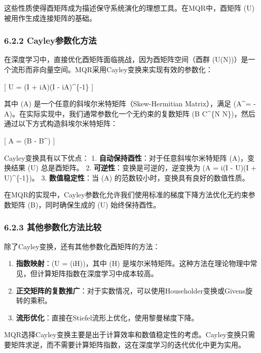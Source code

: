 \documentclass[
  12pt,
]{article}
\providecommand{\tightlist}{%
  \setlength{\itemsep}{0pt}\setlength{\parskip}{0pt}}
\begin{document}
这些性质使得酉矩阵成为描述保守系统演化的理想工具。在MQR中，酉矩阵 (U)
被用作生成连接矩阵的基础。

\hypertarget{cayleyux53c2ux6570ux5316ux65b9ux6cd5}{%
\subsubsection{6.2.2
Cayley参数化方法}\label{cayleyux53c2ux6570ux5316ux65b9ux6cd5}}

在深度学习中，直接优化酉矩阵面临挑战，因为酉矩阵空间（酉群
(U(N))）是一个流形而非向量空间。MQR采用Cayley变换来实现有效的参数化：

{[} U = (I + iA)(I - iA)\^{}\{-1\} {]}

其中 (A) 是一个任意的斜埃尔米特矩阵（Skew-Hermitian Matrix），满足
(A\^{}\dagger = -A)。在实际实现中，我们通常参数化一个无约束的复数矩阵 (B
\in C\^{}\{N \times N\})，然后通过以下方式构造斜埃尔米特矩阵：

{[} A = (B - B\^{}\dagger) {]}

Cayley变换具有以下优点： 1.
\textbf{自动保持酉性}：对于任意斜埃尔米特矩阵 (A)，变换结果 (U)
总是酉矩阵。 2. \textbf{可逆性}：变换是可逆的，逆变换为 (A = i(I - U)(I
+ U)\^{}\{-1\})。 3. \textbf{数值稳定性}：当 (A)
的范数较小时，变换具有良好的数值性质。

在MQR的实现中，Cayley参数化允许我们使用标准的梯度下降方法优化无约束参数矩阵
(B)，同时确保生成的 (U) 始终保持酉性。

\hypertarget{ux5176ux4ed6ux53c2ux6570ux5316ux65b9ux6cd5ux6bd4ux8f83}{%
\subsubsection{6.2.3
其他参数化方法比较}\label{ux5176ux4ed6ux53c2ux6570ux5316ux65b9ux6cd5ux6bd4ux8f83}}

除了Cayley变换，还有其他参数化酉矩阵的方法：

\begin{enumerate}
\def\labelenumi{\arabic{enumi}.}
\tightlist
\item
  \textbf{指数映射}：(U = \exp(iH))，其中 (H)
  是埃尔米特矩阵。这种方法在理论物理中常见，但计算矩阵指数在深度学习中成本较高。
\item
  \textbf{正交矩阵的复数推广}：对于实数情况，可以使用Householder变换或Givens旋转的乘积。
\item
  \textbf{流形优化}：直接在Stiefel流形上优化，使用黎曼梯度下降。
\end{enumerate}

MQR选择Cayley变换主要是出于计算效率和数值稳定性的考虑。Cayley变换只需要矩阵求逆，而不需要计算矩阵指数，这在深度学习的迭代优化中更为实用。
\end{document}
